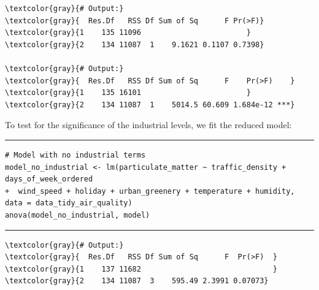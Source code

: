 \documentclass{article}
\begin{document}
\begin{Verbatim}[commandchars=\\\{\}]
\textcolor{gray}{# Output:}
\textcolor{gray}{  Res.Df   RSS Df Sum of Sq      F Pr(>F)}
\textcolor{gray}{1    135 11096                        }   
\textcolor{gray}{2    134 11087  1    9.1621 0.1107 0.7398}

\textcolor{gray}{# Output:}
\textcolor{gray}{  Res.Df   RSS Df Sum of Sq      F    Pr(>F)    }
\textcolor{gray}{1    135 16101                        }          
\textcolor{gray}{2    134 11087  1    5014.5 60.609 1.684e-12 ***}
\end{Verbatim}
 To test for the significance of the industrial levels, we fit the reduced model:
\par\noindent\rule{\textwidth}{0.4pt}
\vspace{-25pt} %
\begin{verbatim}
# Model with no industrial terms
model_no_industrial <- lm(particulate_matter ~ traffic_density + days_of_week_ordered 
+  wind_speed + holiday + urban_greenery + temperature + humidity, data = data_tidy_air_quality)
anova(model_no_industrial, model)
\end{verbatim}
\vspace{-15pt} %
\par\noindent\rule{\textwidth}{0.4pt}
\begin{Verbatim}[commandchars=\\\{\}]
\textcolor{gray}{# Output:}
\textcolor{gray}{  Res.Df   RSS Df Sum of Sq      F  Pr(>F)  }
\textcolor{gray}{1    137 11682                              }
\textcolor{gray}{2    134 11087  3    595.49 2.3991 0.07073}
\end{Verbatim}
\end{document}
